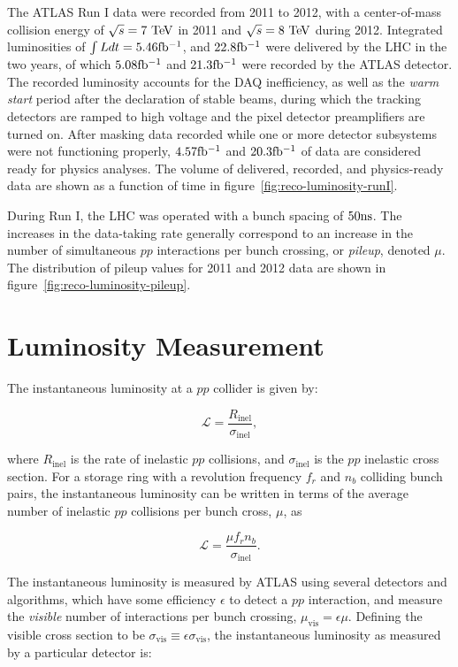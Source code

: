 The ATLAS Run I data were recorded from 2011 to 2012, with a center-of-mass collision energy of $\sqrt{s}=7 \TeV$ in 2011 and $\sqrt{s}=8 \TeV$ during 2012. Integrated luminosities of $\int L dt=5.46 \mbox{fb$^{-1}$}$, and $22.8 \mbox{fb$^{-1}$}$ were delivered by the LHC in the two years, of which $5.08 \mbox{fb$^{-1}$}$ and $21.3 \mbox{fb$^{-1}$}$ were recorded by the ATLAS detector. The recorded luminosity accounts for the DAQ inefficiency, as well as the \emph{warm start} period after the declaration of stable beams, during which the tracking detectors are ramped to high voltage and the pixel detector preamplifiers are turned on. After masking data recorded while one or more detector subsystems were not functioning properly, $4.57 \mbox{fb$^{-1}$}$ and $20.3 \mbox{fb$^{-1}$}$ of data are considered ready for physics analyses. The volume of delivered, recorded, and physics-ready data are shown as a function of time in figure~\ref{fig:reco-luminosity-runI}. 

During Run I, the LHC was operated with a bunch spacing of $50 \mathrm{ns}$. The increases in the data-taking rate generally correspond to an increase in the number of simultaneous $pp$ interactions per bunch crossing, or \emph{pileup}, denoted $\mu$. The distribution of pileup values for 2011 and 2012 data are shown in figure~\ref{fig:reco-luminosity-pileup}. 


\section{Luminosity Measurement}\label{sec:luminosity-measurement}
The instantaneous luminosity at a $pp$ collider is given by:

\begin{equation}
	\mathcal{L} = \frac{R_{\mathrm{inel}}}{\sigma_{\mathrm{inel}}},
\end{equation}

where $R_{\mathrm{inel}}$ is the rate of inelastic $pp$ collisions, and $\sigma_{\mathrm{inel}}$ is the $pp$ inelastic cross section. For a storage ring with a revolution frequency $f_r$ and $n_b$ colliding bunch pairs, the instantaneous luminosity can be written in terms of the average number of inelastic $pp$ collisions per bunch cross, $\mu$, as 

\begin{equation}
	\mathcal{L} = \frac{\mu f_r n_b}{\sigma_{\mathrm{inel}}}.
\end{equation}

The instantaneous luminosity is measured by ATLAS using several detectors and algorithms, which have some efficiency $\epsilon$ to detect a $pp$ interaction, and measure the \emph{visible} number of interactions per bunch crossing, $\mu_{\mathrm{vis}} = \epsilon \mu$. Defining the visible cross section to be $\sigma_{\mathrm{vis}}\equiv \epsilon \sigma_{\mathrm{vis}}$, the instantaneous luminosity as measured by a particular detector is:

